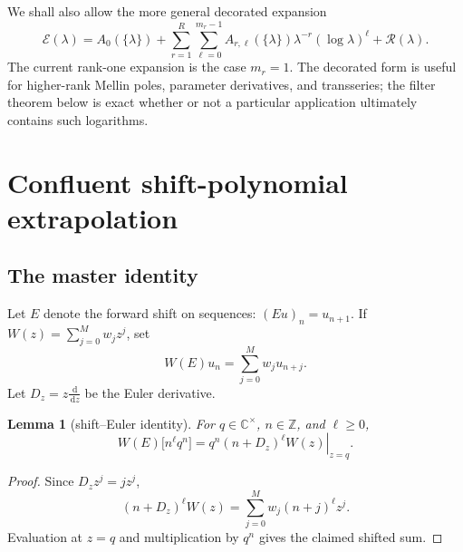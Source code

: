 \documentclass[11pt]{article}
\numberwithin{equation}{section}
\newtheorem{lemma}[theorem]{Lemma}
\theoremstyle{definition}
\theoremstyle{remark}
\newcommand{\Z}{\mathbb Z}
\newcommand{\C}{\mathbb C}
\newcommand{\dd}{\,\mathrm d}
\begin{document}
We shall also allow the more general decorated expansion
\begin{equation}
 \mathscr E(\lambda)
 =A_0(\{\lambda\})
 +\sum_{r=1}^{R}\sum_{\ell=0}^{m_r-1}
 A_{r,\ell}(\{\lambda\})\lambda^{-r}(\log\lambda)^\ell
 +\mathcal R(\lambda).
 \label{p6:eq:decorated-expansion}
\end{equation}
The current rank-one expansion is the case $m_r=1$.  The decorated form is useful for
higher-rank Mellin poles, parameter derivatives, and transseries; the filter theorem below
is exact whether or not a particular application ultimately contains such logarithms.

\section{Confluent shift-polynomial extrapolation}
\label{p6:sec:confluent}

\subsection{The master identity}

Let $E$ denote the forward shift on sequences: $(Eu)_n=u_{n+1}$.  If
$W(z)=\sum_{j=0}^{M}w_jz^j$, set
\[
 W(E)u_n=\sum_{j=0}^{M}w_ju_{n+j}.
\]
Let $D_z=z\frac{\dd}{\dd z}$ be the Euler derivative.

\begin{lemma}[shift--Euler identity]
\label{p6:lem:shift-euler}
For $q\in\C^\times$, $n\in\Z$, and $\ell\ge0$,
\begin{equation}
 W(E)\bigl[n^\ell q^n\bigr]
 =q^n\left.(n+D_z)^\ell W(z)\right|_{z=q}.
 \label{p6:eq:shift-euler}
\end{equation}
\end{lemma}

\begin{proof}
Since $D_zz^j=jz^j$,
\[
 (n+D_z)^\ell W(z)
 =\sum_{j=0}^{M}w_j(n+j)^\ell z^j.
\]
Evaluation at $z=q$ and multiplication by $q^n$ gives the claimed shifted sum.
\end{proof}
\end{document}
